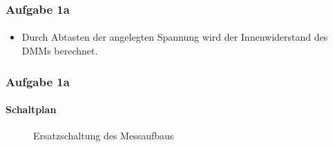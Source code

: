 \begin{frame}
\frametitle{Aufgabe 1a}
\framesubtitle{}
        \begin{itemize}
            \item Durch Abtasten der angelegten Spannung wird der Innenwiderstand des
            DMMs berechnet. 
        \end{itemize}
\end{frame}
\begin{frame}
    \frametitle{Aufgabe 1a}
    \framesubtitle{Schaltplan}
    \begin{figure}[H]
    \begin{center}
        \caption{Ersatzschaltung des Messaufbaus}
    \end{center}
    \end{figure}
    
\end{frame}
